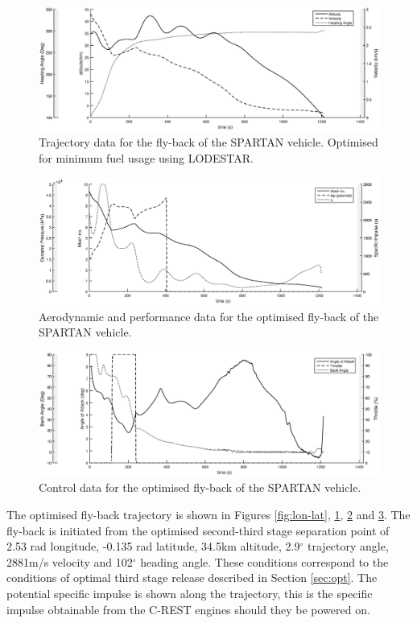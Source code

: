 \documentclass{article}
\begin{document}
\begin{figure}[h]
	\centering
	\includegraphics[width=0.9\linewidth]{Figures/Traj1}
	\caption{Trajectory data for the fly-back of the SPARTAN vehicle. Optimised for minimum fuel usage using LODESTAR. }
	\label{fig:Traj1}
\end{figure}
\begin{figure}[h]
	\centering
	\includegraphics[width=0.9\linewidth]{Figures/Traj2}
	\caption{Aerodynamic and performance data for the optimised fly-back of the SPARTAN vehicle. }
	\label{fig:Traj2}
\end{figure}
\begin{figure}[h]
	\centering
	\includegraphics[width=0.9\linewidth]{Figures/Traj3}
	\caption{Control data for the optimised fly-back of the SPARTAN vehicle.}
	\label{fig:Traj3}
\end{figure}

The optimised fly-back trajectory is shown in Figures \ref{fig:lon-lat}, \ref{fig:Traj1}, \ref{fig:Traj2} and \ref{fig:Traj3}.
The fly-back is initiated from the optimised second-third stage separation point of 2.53 rad longitude, -0.135 rad latitude, 34.5km altitude, 2.9$^\circ$ trajectory angle, 2881m/s velocity and 102$^\circ$ heading angle. These conditions correspond to the conditions of optimal third stage release described in Section \ref*{sec:opt}. The potential specific impulse is shown along the trajectory, this is the specific impulse obtainable from the C-REST engines should they be powered on.
\end{document}
